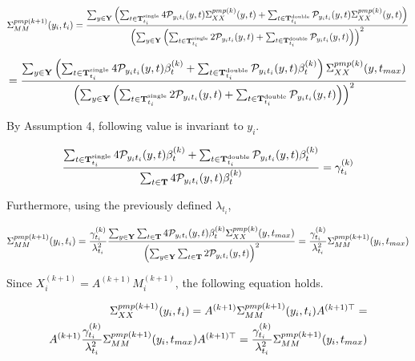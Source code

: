 \begin{align}
\Sigma^{pmp(k+1)}_{MM}(y_i,t_i) = {\sum_{y\in \bold{Y}}\left(\sum_{t\in\bold{T}_{t_i}^{\text{single}}}4\mathcal{P}_{y_i t_i}(y, t)\Sigma^{pmp(k)}_{XX}(y,t)+\sum_{t\in\bold{T}_{t_i}^{\text{double}}}\mathcal{P}_{y_i t_i}(y, t)\Sigma^{pmp(k)}_{XX}(y,t)\right)
\over
\left(\sum_{y\in \bold{Y}}\left(\sum_{t\in\bold{T}_{t_i}^{\text{single}}}2\mathcal{P}_{y_i t_i}(y, t)+\sum_{t\in\bold{T}_{t_i}^{\text{double}}}\mathcal{P}_{y_i t_i}(y, t)\right)\right)^2}
\end{align}

\begin{align}
 = {\sum_{y\in \bold{Y}}\left(\sum_{t\in\bold{T}_{t_i}^{\text{single}}}4\mathcal{P}_{y_i t_i}(y, t)\beta_{t}^{(k)}+\sum_{t\in\bold{T}_{t_i}^{\text{double}}}\mathcal{P}_{y_i t_i}(y, t)\beta_{t}^{(k)}\right)\Sigma_{XX}^{pmp (k)}(y,t_{max})
\over
\left(\sum_{y\in \bold{Y}}\left(\sum_{t\in\bold{T}_{t_i}^{\text{single}}}2\mathcal{P}_{y_i t_i}(y, t)+\sum_{t\in\bold{T}_{t_i}^{\text{double}}}\mathcal{P}_{y_i t_i}(y, t)\right)\right)^2}
\end{align}

By Assumption 4, following value is invariant to $y_i$.

\begin{align}
{\sum_{t\in\bold{T}_{t_i}^{\text{single}}}4\mathcal{P}_{y_i t_i}(y, t)\beta_t^{(k)}+\sum_{t\in\bold{T}_{t_i}^{\text{double}}}\mathcal{P}_{y_i t_i}(y, t)\beta_t^{(k)}\over \sum_{t\in\bold{T}}4\mathcal{P}_{y_i t_i}(y, t)\beta_t^{(k)}}=\gamma_{t_i}^{(k)}
\end{align}

Furthermore, using the previously defined $\lambda_{t_i}$,

\begin{align}
\Sigma^{pmp(k+1)}_{MM}(y_i,t_i) = {\gamma_{t_i}^{(k)}\over\lambda_{t_i}^2} {\sum_{y\in \bold{Y}}\sum_{t\in\bold{T}}4\mathcal{P}_{y_i t_i}(y, t)\beta_t^{(k)}\Sigma_{XX}^{pmp (k)}(y,t_{max})
\over
\left(\sum_{y\in \bold{Y}}\sum_{t\in\bold{T}}2\mathcal{P}_{y_i t_i}(y, t)\right)^2} = {\gamma_{t_i}^{(k)}\over\lambda_{t_i}^2} \Sigma^{pmp(k+1)}_{MM}(y_i,t_{max}) 
\end{align}

Since $X_i^{(k+1)}=A^{(k+1)}M_i^{(k+1)}$, the following equation holds.

\begin{align}
\Sigma^{pmp(k+1)}_{XX}(y_i,t_i)= A^{(k+1)}\Sigma^{pmp(k+1)}_{MM}(y_i,t_i)A^{(k+1)\top}=\\A^{(k+1)}{\gamma_{t_i}^{(k)}\over\lambda_{t_i}^2}\Sigma^{pmp(k+1)}_{MM}(y_i,t_{max})A^{(k+1)\top} ={\gamma_{t_i}^{(k)}\over\lambda_{t_i}^2} \Sigma^{pmp(k+1)}_{MM}(y_i,t_{max}) 
\end{align}

